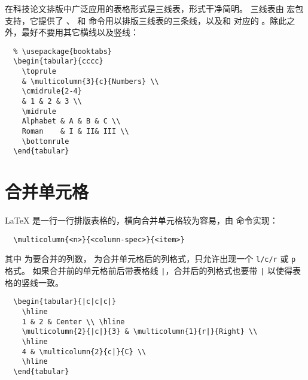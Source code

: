 在科技论文排版中广泛应用的表格形式是三线表，形式干净简明。
三线表由  宏包支持，它提供了 、 和  命令用以排版三线表的三条线，以及和  对应的 。除此之外，最好不要用其它横线以及竖线：
\begin{lstlisting}
  % \usepackage{booktabs}
  \begin{tabular}{cccc}
    \toprule
    & \multicolumn{3}{c}{Numbers} \\
    \cmidrule{2-4}
    & 1 & 2 & 3 \\
    \midrule
    Alphabet & A & B & C \\
    Roman    & I & II& III \\
    \bottomrule
  \end{tabular}
\end{lstlisting}

\begin{center}
\end{center}
\section{合并单元格}
\LaTeX{} 是一行一行排版表格的，横向合并单元格较为容易，由  命令实现：
\begin{lstlisting}
  \multicolumn{<n>}{<column-spec>}{<item>}
\end{lstlisting}
其中  为要合并的列数， 为合并单元格后的列格式，只允许出现一个 \texttt{l/c/r} 或 \texttt{p} 格式。
如果合并前的单元格前后带表格线 \texttt|，合并后的列格式也要带 \texttt| 以使得表格的竖线一致。
\begin{lstlisting}
  \begin{tabular}{|c|c|c|}
    \hline
    1 & 2 & Center \\ \hline
    \multicolumn{2}{|c|}{3} & \multicolumn{1}{r|}{Right} \\ 
    \hline
    4 & \multicolumn{2}{c|}{C} \\ 
    \hline
  \end{tabular}
\end{lstlisting}
\begin{center}
\end{center}

